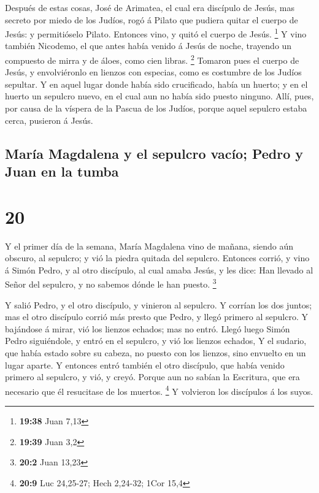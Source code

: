  Después de estas cosas, José de Arimatea, el cual era
discípulo de Jesús, mas secreto por miedo de los Judíos, rogó á Pilato
que pudiera quitar el cuerpo de Jesús: y permitióselo Pilato. Entonces
vino, y quitó el cuerpo de Jesús. \footnote{\textbf{19:38} Juan 7,13}
 Y vino también Nicodemo, el que antes había venido á
Jesús de noche, trayendo un compuesto de mirra y de áloes, como cien
libras. \footnote{\textbf{19:39} Juan 3,2}  Tomaron pues
el cuerpo de Jesús, y envolviéronlo en lienzos con especias, como es
costumbre de los Judíos sepultar.  Y en aquel lugar donde
había sido crucificado, había un huerto; y en el huerto un sepulcro
nuevo, en el cual aun no había sido puesto ninguno. 
Allí, pues, por causa de la víspera de la Pascua de los Judíos, porque
aquel sepulcro estaba cerca, pusieron á Jesús.

\hypertarget{maruxeda-magdalena-y-el-sepulcro-vacuxedo-pedro-y-juan-en-la-tumba}{%
\subsection{María Magdalena y el sepulcro vacío; Pedro y Juan en la
tumba}\label{maruxeda-magdalena-y-el-sepulcro-vacuxedo-pedro-y-juan-en-la-tumba}}

\hypertarget{section-19}{%
\section{20}\label{section-19}}

 Y el primer día de la semana, María Magdalena vino de
mañana, siendo aún obscuro, al sepulcro; y vió la piedra quitada del
sepulcro.  Entonces corrió, y vino á Simón Pedro, y al
otro discípulo, al cual amaba Jesús, y les dice: Han llevado al Señor
del sepulcro, y no sabemos dónde le han puesto. \footnote{\textbf{20:2}
  Juan 13,23}

 Y salió Pedro, y el otro discípulo, y vinieron al
sepulcro.  Y corrían los dos juntos; mas el otro discípulo
corrió más presto que Pedro, y llegó primero al sepulcro. 
Y bajándose á mirar, vió los lienzos echados; mas no entró.
 Llegó luego Simón Pedro siguiéndole, y entró en el
sepulcro, y vió los lienzos echados,  Y el sudario, que
había estado sobre su cabeza, no puesto con los lienzos, sino envuelto
en un lugar aparte.  Y entonces entró también el otro
discípulo, que había venido primero al sepulcro, y vió, y creyó.
 Porque aun no sabían la Escritura, que era necesario que
él resucitase de los muertos. \footnote{\textbf{20:9} Luc 24,25-27; Hech
  2,24-32; 1Cor 15,4}  Y volvieron los discípulos á los
suyos.

